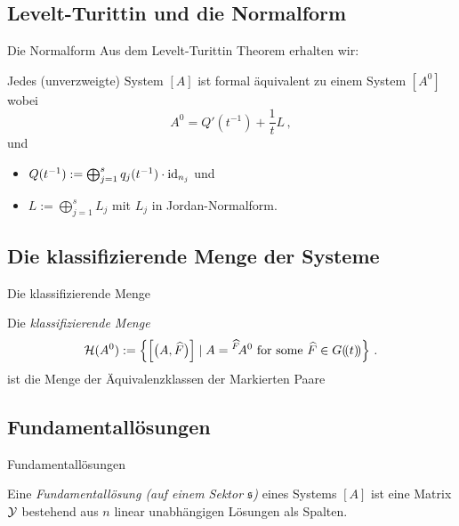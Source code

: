 \subsection{Levelt-Turittin und die Normalform}
\begin{frame}{Die Normalform}
  Aus dem Levelt-Turittin Theorem erhalten wir:
  \begin{prop}
    Jedes (unverzweigte) System $[A]$ ist formal äquivalent zu einem
    System $[A^0]$ wobei
    \[
      A^0=Q'(t^{-1})+\frac{1}{t}L \,,
    \]
    und
    \begin{itemize}
    \item $Q(t^{-1}):=\bigoplus_{j=1}^sq_j(t^{-1})\cdot\operatorname{id}_{n_j}$ und
    \item $L:=\bigoplus_{j=1}^sL_j$ mit $L_j$ in Jordan-Normalform.
    \end{itemize}
  \end{prop}
\end{frame}

\subsection{Die klassifizierende Menge der Systeme}
\begin{frame}{Die klassifizierende Menge}
  \begin{defn}
    Die \emph{klassifizierende Menge}
    \[
      \mathcal{H}(A^0):=\left\{\left[\bigl(A,\widehat F\bigl)\right]
        \mid A={}^{\widehat F}\!A^0 \text{ for some } \widehat F\in G(\!(t)\!)\right\} \,.
    \]
    ist die Menge der Äquivalenzklassen der Markierten Paare \TODO[\dots]
  \end{defn}
\end{frame}

\subsection{Fundamentallösungen}
\begin{frame}{Fundamentallösungen}
  \TODO[nötig?]
  \begin{defn}
    Eine \emph{Fundamentallösung (auf einem Sektor \boldmath$\mathfrak{s}$)}
    eines Systems $[A]$ ist eine Matrix $\mathcal{Y}$ bestehend aus $n$ linear
    unabhängigen Lösungen als Spalten.
  \end{defn}
\end{frame}

